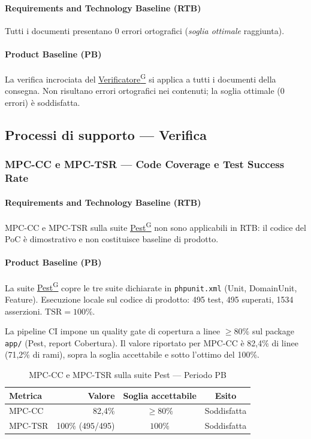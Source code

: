\documentclass[a4paper,12pt]{article}
\providecommand{\glslink}[2]{\href{https://alittlebyte-19.github.io/Documentazione/glossario.html\#gls-#1}{\underline{#2}\textsuperscript{\scriptsize G}}}
\begin{document}
\paragraph*{Requirements and Technology Baseline (RTB)} Tutti i documenti presentano 0 errori ortografici (\emph{soglia ottimale} raggiunta).

\paragraph*{Product Baseline (PB)} La verifica incrociata del \glslink{verificatore}{Verificatore} si applica a tutti i documenti della consegna. Non risultano errori ortografici nei contenuti; la soglia ottimale (0 errori) è soddisfatta.

\subsection{Processi di supporto — Verifica}

\subsubsection{MPC-CC e MPC-TSR — Code Coverage e Test Success Rate}

\paragraph*{Requirements and Technology Baseline (RTB)} MPC-CC e MPC-TSR sulla suite \glslink{pest}{Pest} non sono applicabili in RTB: il codice del PoC è dimostrativo e non costituisce baseline di prodotto.

\paragraph*{Product Baseline (PB)} La suite \glslink{pest}{Pest} copre le tre suite dichiarate in \texttt{phpunit.xml} (Unit, DomainUnit, Feature). Esecuzione locale sul codice di prodotto: 495 test, 495 superati, 1534 asserzioni. $\text{TSR} = 100\%$.

La pipeline CI impone un quality gate di copertura a linee $\geq 80\%$ sul package \texttt{app/} (Pest, report Cobertura). Il valore riportato per MPC-CC è 82,4\% di linee (71,2\% di rami), sopra la soglia accettabile e sotto l'ottimo del 100\%.

\begin{table}[H]
\centering
{}
\begin{tabular}{|l|r|c|c|}
    \hline
    \rowcolor{gray!35}
    \textbf{Metrica} & \textbf{Valore} & \textbf{Soglia accettabile} & \textbf{Esito} \\
    \hline
    MPC-CC  & 82,4\% & $\geq 80\%$ & \textcolor{green!60!black}{Soddisfatta} \\
    MPC-TSR & 100\% (495/495) & $100\%$ & \textcolor{green!60!black}{Soddisfatta} \\
    \hline
\end{tabular}
\caption{MPC-CC e MPC-TSR sulla suite Pest — Periodo PB}
\end{table}
\end{document}
